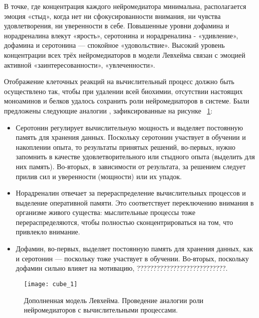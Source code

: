 В точке, где концентрация каждого нейромедиатора минимальна, располагается эмоция «стыд», когда нет ни сфокусированности внимания, ни чувства удовлетворения, ни уверенности в себе. Повышенные уровни дофамина и норадреналина влекут «ярость», серотонина и норадреналина - «удивление», дофамина и серотонина — спокойное «удовольствие». Высокий уровень концентрации всех трёх нейромедиаторов в модели Левхейма связан с эмоцией активной «заинтересованности», «увлеченности».


Отображение клеточных реакций на вычислительный процесс должно быть осуществлено так, чтобы при удалении всей биохимии, отсутствии настоящих моноаминов и белков удалось сохранить роли нейромедиаторов в системе. Были предложены следующие аналогии \cite{talanov2014}, зафиксированные на рисунке ~\ref{fig:cube_1}:
\begin{itemize}
\item Серотонин регулирует вычислительную мощность и выделяет постоянную память для хранения данных. Поскольку серотонин участвует в обучении и накоплении опыта, то результаты принятых решений, во-первых, нужно запомнить в качестве удовлетворительного или стыдного опыта (выделить для них память). Во-вторых, в зависимости от результата, за решением следует прилив сил и уверенности (мощности) или их упадок.
\item Норадреналин отвечает за перераспределение вычислительных процессов и выделение оперативной памяти. Это соответствует переключению внимания в организме живого существа: мыслительные процессы тоже перераспределяются, чтобы полностью сконцентрироваться на том, что привлекло внимание.
\item Дофамин, во-первых, выделяет постоянную память для хранения данных, как и серотонин — поскольку тоже участвует в обучении. Во-вторых, поскольку дофамин сильно влияет на мотивацию, ???????????????????????????.
\end{itemize}


\begin{figure}
	\centering
	\texttt{[image: cube\_1]}
	\caption{Дополненная модель Левхейма. Проведение аналогии роли нейромедиаторов с вычислительными процессами.}
	\label{fig:cube_1}
\end{figure}
